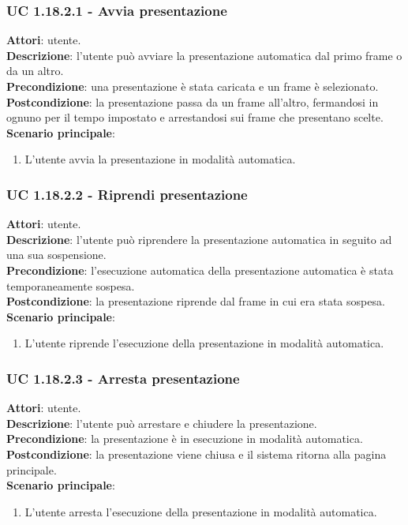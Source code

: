	\subsubsection{UC 1.18.2.1 - Avvia presentazione}{
		\label{uc1.18.2.1}
		\textbf{Attori}: utente. \\
		\textbf{Descrizione}: l'utente può avviare la presentazione automatica dal primo frame o da un altro. \\
		\textbf{Precondizione}: una presentazione è stata caricata e un frame è selezionato.	\\
		\textbf{Postcondizione}: la presentazione passa da un frame all'altro, fermandosi in ognuno per il tempo impostato e arrestandosi sui frame che presentano scelte.	\\
		\textbf{Scenario principale}:
		\begin{enumerate}
			\item L'utente avvia la presentazione in modalità automatica.
		\end{enumerate}
	}
	\subsubsection{UC 1.18.2.2 - Riprendi presentazione}{
		\label{uc1.18.2.2}
		\textbf{Attori}: utente. \\
		\textbf{Descrizione}: l'utente può riprendere la presentazione automatica in seguito ad una sua sospensione. \\
		\textbf{Precondizione}: l'esecuzione automatica della presentazione automatica è stata temporaneamente sospesa.	\\
		\textbf{Postcondizione}: la presentazione riprende dal frame in cui era stata sospesa.\\
		\textbf{Scenario principale}:
		\begin{enumerate}
			\item L'utente riprende l'esecuzione della presentazione in modalità automatica.
		\end{enumerate}		
	}
	\subsubsection{UC 1.18.2.3 - Arresta presentazione}{
		\label{uc1.18.2.3}
		\textbf{Attori}: utente. \\
		\textbf{Descrizione}: l'utente può arrestare e chiudere la presentazione. \\
		\textbf{Precondizione}: la presentazione è in esecuzione in modalità automatica.	\\
		\textbf{Postcondizione}: la presentazione viene chiusa e il sistema ritorna alla pagina principale.\\
		\textbf{Scenario principale}:
		\begin{enumerate}
			\item L'utente arresta l'esecuzione della presentazione in modalità automatica.
		\end{enumerate}		
	}
